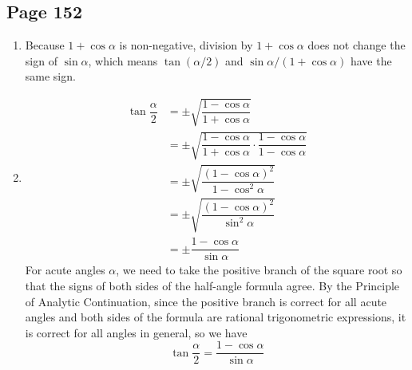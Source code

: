 \documentclass{article}
\newenvironment{solutions}[1]
{\subsection*{#1}
 \begin{enumerate}[leftmargin=1.5em]}
{\end{enumerate}}
\newcommand{\solution}{\item}
\begin{document}
\begin{solutions}{Page 152}
\solution %
Because $1+\cos{\alpha}$ is non-negative, division by $1+\cos{\alpha}$ does not change the sign of $\sin{\alpha}$, which means $\tan \left(\alpha / 2\right)$ and $\sin{\alpha} / \left(1+\cos{\alpha}\right)$ have the same sign.

\solution %
\begin{align*}
\tan{\dfrac{\alpha}{2}} &= \pm \sqrt{\dfrac{1-\cos{\alpha}}{1+\cos{\alpha}}} \\
&= \pm \sqrt{\dfrac{1-\cos{\alpha}}{1+\cos{\alpha}} \cdot \dfrac{1-\cos{\alpha}}{1-\cos{\alpha}}} \\
&= \pm \sqrt{\dfrac{\left(1-\cos{\alpha}\right)^2}{1-\cos^{2}{\alpha}}} \\
&= \pm \sqrt{\dfrac{\left(1-\cos{\alpha}\right)^2}{\sin^{2}{\alpha}}} \\
&= \pm \dfrac{1-\cos{\alpha}}{\sin{\alpha}}
\end{align*}
For acute angles $\alpha$, we need to take the positive branch of the square root so that the signs of both sides of the half-angle formula agree. By the Principle of Analytic Continuation, since the positive branch is correct for all acute angles and both sides of the formula are rational trigonometric expressions, it is correct for all angles in general, so we have
\[
\tan{\dfrac{\alpha}{2}} = \dfrac{1-\cos{\alpha}}{\sin{\alpha}}
\]

\end{solutions}
\end{document}

